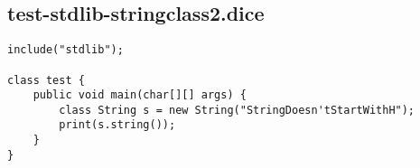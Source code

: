 \subsection{test-stdlib-stringclass2.dice}
\begin{verbatim}
include("stdlib");

class test {
	public void main(char[][] args) {
        class String s = new String("StringDoesn'tStartWithH");
        print(s.string());
	}
}

\end{verbatim}